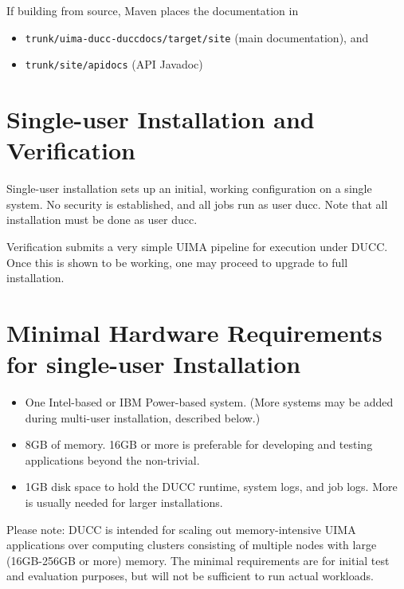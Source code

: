 If building from source, Maven places the documentation in
\begin{itemize}
    \item {\tt trunk/uima-ducc-duccdocs/target/site} (main documentation), and 
    \item {\tt trunk/site/apidocs} (API Javadoc)
\end{itemize}

\section{Single-user  Installation and Verification}

Single-user installation sets up an initial, working configuration on a single system.  No security
is established, and all jobs run as user ducc.  Note that all installation must be done as user ducc.

Verification submits a very simple UIMA pipeline for execution under DUCC.  Once this is shown to be
working, one may proceed to upgrade to full installation.


\section{Minimal Hardware Requirements for single-user Installation}
\begin{itemize}
    \item One Intel-based or IBM Power-based system.  (More systems may be added during multi-user
      installation, described below.)

    \item 8GB of memory.  16GB or more is preferable for developing and testing applications beyond
      the non-trivial.  

    \item 1GB disk space to hold the DUCC runtime, system logs, and job logs.  More is
      usually needed for larger installations.  
\end{itemize}

Please note: DUCC is intended for scaling out memory-intensive UIMA applications over computing
clusters consisting of multiple nodes with large (16GB-256GB or more) memory.  The minimal
requirements are for initial test and evaluation purposes, but will not be sufficient to run actual
workloads.

